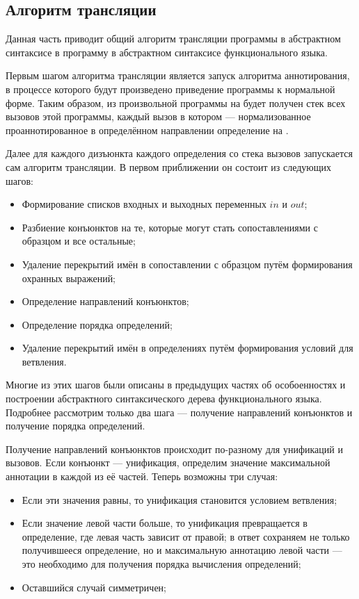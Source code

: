 \subsection{Алгоритм трансляции}

Данная часть приводит общий алгоритм трансляции программы в абстрактном синтаксисе \miniKanren{} в программу в абстрактном синтаксисе функционального языка.

Первым шагом алгоритма трансляции является запуск алгоритма аннотирования, в процессе которого будут произведено приведение программы к нормальной форме.
Таким образом, из произвольной программы на \miniKanren{} будет получен стек всех вызовов этой программы, каждый вызов в котором --- нормализованное проаннотированное в определённом направлении определение на \miniKanren{}.

Далее для каждого дизъюнкта каждого определения со стека вызовов запускается сам алгоритм трансляции.
В первом приближении он состоит из следующих шагов:
\begin{itemize}
    \item Формирование списков входных и выходных переменных $in$ и $out$;
    \item Разбиение конъюнктов на те, которые могут стать сопоставлениями с образцом и все остальные;
    \item Удаление перекрытий имён в сопоставлении с образцом путём формирования охранных выражений;
    \item Определение направлений конъюнктов;
    \item Определение порядка определений;
    \item Удаление перекрытий имён в определениях путём формирования условий для ветвления.
\end{itemize}

Многие из этих шагов были описаны в предыдущих частях об особоенностях \miniKanren{} и построении абстрактного синтаксического дерева функционального языка.
Подробнее рассмотрим только два шага --- получение направлений конъюнктов и получение порядка определений.

Получение направлений конъюнктов происходит по-разному для унификаций и вызовов.
Если конъюнкт --- унификация, определим значение максимальной аннотации в каждой из её частей.
Теперь возможны три случая:
\begin{itemize}
    \item Если эти значения равны, то унификация становится условием ветвления;
    \item Если значение левой части больше, то унификация превращается в определение, где левая часть зависит от правой; в ответ сохраняем не только получившееся определение, но и максимальную аннотацию левой части --- это необходимо для получения порядка вычисления определений;
    \item Оставшийся случай симметричен;
\end{itemize}

